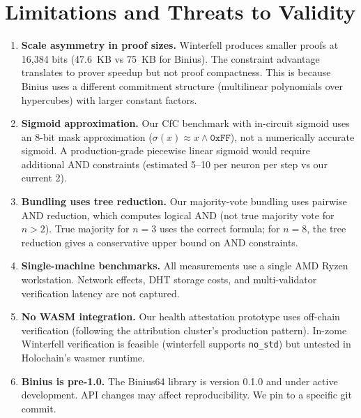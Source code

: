 \documentclass[11pt,twocolumn]{article}
\begin{document}
\section{Limitations and Threats to Validity}

\begin{enumerate}
    \item \textbf{Scale asymmetry in proof sizes.} Winterfell produces smaller proofs at 16,384 bits (47.6~KB vs 75~KB for Binius). The constraint advantage translates to prover speedup but not proof compactness. This is because Binius uses a different commitment structure (multilinear polynomials over hypercubes) with larger constant factors.

    \item \textbf{Sigmoid approximation.} Our CfC benchmark with in-circuit sigmoid uses an 8-bit mask approximation ($\sigma(x) \approx x \wedge \texttt{0xFF}$), not a numerically accurate sigmoid. A production-grade piecewise linear sigmoid would require additional AND constraints (estimated 5--10 per neuron per step vs our current 2).

    \item \textbf{Bundling uses tree reduction.} Our majority-vote bundling uses pairwise AND reduction, which computes logical AND (not true majority vote for $n > 2$). True majority for $n = 3$ uses the correct formula; for $n = 8$, the tree reduction gives a conservative upper bound on AND constraints.

    \item \textbf{Single-machine benchmarks.} All measurements use a single AMD Ryzen workstation. Network effects, DHT storage costs, and multi-validator verification latency are not captured.

    \item \textbf{No WASM integration.} Our health attestation prototype uses off-chain verification (following the attribution cluster's production pattern). In-zome Winterfell verification is feasible (winterfell supports \texttt{no\_std}) but untested in Holochain's wasmer runtime.

    \item \textbf{Binius is pre-1.0.} The Binius64 library is version 0.1.0 and under active development. API changes may affect reproducibility. We pin to a specific git commit.
\end{enumerate}
\end{document}
